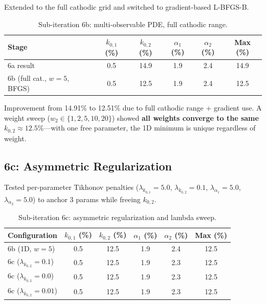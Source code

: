 \documentclass[11pt]{article}
\begin{document}
Extended to the full cathodic grid and switched to gradient-based L-BFGS-B.

\begin{table}[htbp]
  \centering
  \caption{Sub-iteration 6b: multi-observable PDE, full cathodic range.}
  \label{tab:s6b}
  \begin{tabular}{l S[round-precision=1] S[round-precision=1]
                    S[round-precision=1] S[round-precision=1]
                    S[round-precision=1]}
    \toprule
    Stage & {$k_{0,1}$ (\%)} & {$k_{0,2}$ (\%)}
          & {$\alpha_1$ (\%)} & {$\alpha_2$ (\%)}
          & {Max (\%)} \\
    \midrule
    6a result                     &  0.5 & 14.9 &  1.9 &  2.4 & 14.9 \\
    6b (full cat., $w{=}5$, BFGS) &  0.5 & 12.5 &  1.9 &  2.4 & 12.5 \\
    \bottomrule
  \end{tabular}
\end{table}

Improvement from 14.91\% to 12.51\% due to full cathodic range + gradient use.
A weight sweep ($w_2 \in \{1, 2, 5, 10, 20\}$) showed \textbf{all weights
converge to the same $k_{0,2} \approx 12.5\%$}---with one free parameter,
the 1D minimum is unique regardless of weight.

\subsection{6c: Asymmetric Regularization}

Tested per-parameter Tikhonov penalties ($\lambda_{k_{0,1}} = 5.0$,
$\lambda_{k_{0,2}} = 0.1$, $\lambda_{\alpha_1} = 5.0$,
$\lambda_{\alpha_2} = 5.0$) to anchor 3 params while freeing $k_{0,2}$.

\begin{table}[htbp]
  \centering
  \caption{Sub-iteration 6c: asymmetric regularization and lambda sweep.}
  \label{tab:s6c}
  \begin{tabular}{l S[round-precision=1] S[round-precision=1]
                    S[round-precision=1] S[round-precision=1]
                    S[round-precision=1]}
    \toprule
    Configuration & {$k_{0,1}$ (\%)} & {$k_{0,2}$ (\%)}
                  & {$\alpha_1$ (\%)} & {$\alpha_2$ (\%)}
                  & {Max (\%)} \\
    \midrule
    6b (1D, $w{=}5$)                &  0.5 & 12.5 &  1.9 &  2.4 & 12.5 \\
    6c ($\lambda_{k_{0,2}}{=}0.1$)  &  0.5 & 12.5 &  1.9 &  2.3 & 12.5 \\
    6c ($\lambda_{k_{0,2}}{=}0.0$)  &  0.5 & 12.5 &  1.9 &  2.3 & 12.5 \\
    6c ($\lambda_{k_{0,2}}{=}0.01$) &  0.5 & 12.5 &  1.9 &  2.3 & 12.5 \\
    \bottomrule
  \end{tabular}
\end{table}
\end{document}
